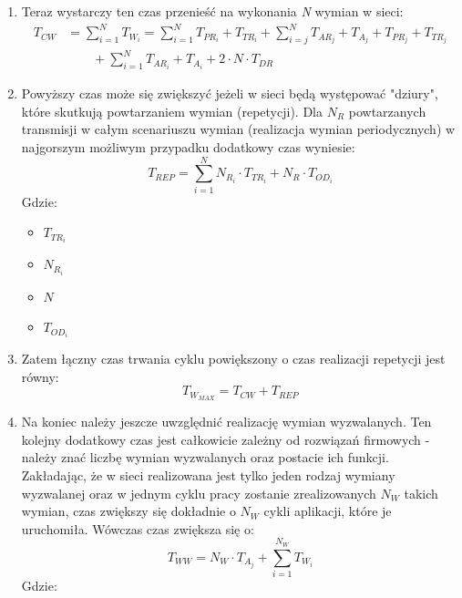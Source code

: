 \documentclass[a4paper,twoside]{article}
\begin{document}
\begin{enumerate}
		\item Teraz wystarczy ten czas przenieść na wykonania \emph{N} wymian w sieci:
		\begin{align}
			T_{CW} &= \sum_{i=1}^{N}{T_{W_i}}=
			\sum_{i=1}^{N}{{T_{PR_i} + T_{TR_i}}} + 
		 	\sum_{i=j}^{N}{T_{AR_j}+T_{A_j}+T_{PR_j}+T_{TR_j}} \nonumber \\
			&\qquad {} + \sum_{i=1}^{N}{T_{AR_i}+T_{A_i}} +
			2\cdot N\cdot T_{DR}
		\end{align}
		\item Powyższy czas może się zwiększyć jeżeli w sieci będą występować "dziury", które skutkują powtarzaniem wymian (repetycji). Dla $ N_R $ powtarzanych transmisji w całym scenariuszu wymian (realizacja wymian periodycznych) w najgorszym możliwym przypadku dodatkowy czas wyniesie:
		\begin{equation}
			T_{REP} = \sum_{i=1}^{N}{N_{R_i}\cdot T_{TR_i}+N_R\cdot T_{OD_i}}
		\end{equation}
		Gdzie:
		\begin{itemize}
			\item $ T_{TR_i} $ 
			\item $ N_{R_i} $ 
			\item $ N $ 
			\item $ T_{OD_i} $ 
		\end{itemize}
		\item Zatem łączny czas trwania cyklu powiększony o czas realizacji repetycji jest równy:
		\begin{equation}
			T_{W_{MAX}}=T_{CW}+T_{REP}
		\end{equation}
		\item Na koniec należy jeszcze uwzględnić realizację wymian wyzwalanych. Ten kolejny dodatkowy czas jest całkowicie zależny od rozwiązań firmowych - należy znać liczbę wymian wyzwalanych oraz postacie ich funkcji.\\
		Zakładając, że w sieci realizowana jest tylko jeden rodzaj wymiany wyzwalanej oraz w jednym cyklu pracy zostanie zrealizowanych $ N_W $ takich wymian, czas zwiększy się dokładnie o $ N_W $ cykli aplikacji, które je uruchomiła. Wówczas czas zwiększa się o:
		\begin{equation}
			T_{WW} = N_W\cdot T_{A_j} + \sum_{i=1}^{N_W}{T_{W_i}}
		\end{equation}
		Gdzie:
		\begin{itemize}

\end{itemize}
\end{enumerate}
\end{document}
